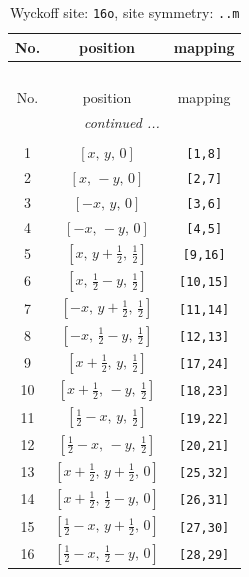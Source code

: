 \documentclass[fleqn,8pt]{jsarticle}
\begin{document}
\renewcommand{\arraystretch}{1.2}
\begin{longtable}{ccc}
\caption{Wyckoff site: {\tt 16o}, site symmetry: {\tt ..m}}
 \\
 \hline \hline
No. & position & mapping \\ \hline \endfirsthead

\multicolumn{2}{l}{\tablename\ \thetable{}} \\
 \hline \hline
No. & position & mapping \\ \hline \endhead

 \hline \hline
\multicolumn{2}{r}{\footnotesize\it continued ...} \\ \endfoot

 \hline \hline
\multicolumn{2}{r}{} \\ \endlastfoot

1 & $\left[ x,\, y,\, 0 \right]$ & {\tt [1,8]} \\ \hline
2 & $\left[ x,\, - y,\, 0 \right]$ & {\tt [2,7]} \\ \hline
3 & $\left[ - x,\, y,\, 0 \right]$ & {\tt [3,6]} \\ \hline
4 & $\left[ - x,\, - y,\, 0 \right]$ & {\tt [4,5]} \\ \hline
5 & $\left[ x,\, y + \frac{1}{2},\, \frac{1}{2} \right]$ & {\tt [9,16]} \\ \hline
6 & $\left[ x,\, \frac{1}{2} - y,\, \frac{1}{2} \right]$ & {\tt [10,15]} \\ \hline
7 & $\left[ - x,\, y + \frac{1}{2},\, \frac{1}{2} \right]$ & {\tt [11,14]} \\ \hline
8 & $\left[ - x,\, \frac{1}{2} - y,\, \frac{1}{2} \right]$ & {\tt [12,13]} \\ \hline
9 & $\left[ x + \frac{1}{2},\, y,\, \frac{1}{2} \right]$ & {\tt [17,24]} \\ \hline
10 & $\left[ x + \frac{1}{2},\, - y,\, \frac{1}{2} \right]$ & {\tt [18,23]} \\ \hline
11 & $\left[ \frac{1}{2} - x,\, y,\, \frac{1}{2} \right]$ & {\tt [19,22]} \\ \hline
12 & $\left[ \frac{1}{2} - x,\, - y,\, \frac{1}{2} \right]$ & {\tt [20,21]} \\ \hline
13 & $\left[ x + \frac{1}{2},\, y + \frac{1}{2},\, 0 \right]$ & {\tt [25,32]} \\ \hline
14 & $\left[ x + \frac{1}{2},\, \frac{1}{2} - y,\, 0 \right]$ & {\tt [26,31]} \\ \hline
15 & $\left[ \frac{1}{2} - x,\, y + \frac{1}{2},\, 0 \right]$ & {\tt [27,30]} \\ \hline
16 & $\left[ \frac{1}{2} - x,\, \frac{1}{2} - y,\, 0 \right]$ & {\tt [28,29]} \\
\end{longtable}
\end{document}

